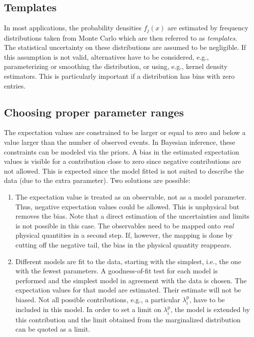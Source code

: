 \documentclass[11pt, a4paper]{article}
\begin{document}
\subsection{Templates} 

In most applications, the probability densities $f_{j}(x)$ are
estimated by frequency distributions taken from Monte Carlo which are
then referred to as {\it templates}. The statistical uncertainty on
these distributions are assumed to be negligible. If this assumption
is not valid, alternatives have to be considered, e.g., parameterizing
or smoothing the distribution, or using, e.g., kernel density
estimators. This is particularly important if a distribution has bins
with zero entries. 

\subsection{Choosing proper parameter ranges} 

The expectation values are constrained to be larger or equal to zero
and below a value larger than the number of observed events. In
Bayesian inference, these constraints can be modeled via the priors. A
bias in the estimated expectation values is visible for a contribution
close to zero since negative contributions are not allowed. This is
expected since the model fitted is not suited to describe the data
(due to the extra parameter). Two solutions are possible:
%
\begin{enumerate}
	\item The expectation value is treated as an observable, not as a
	model parameter. Thus, negative expectation values could be
	allowed. This is unphysical but removes the bias. Note that a direct
	estimation of the uncertainties and limits is not possible in this
	case. The observables need to be mapped onto {\it real} physical
	quantities in a second step. If, however, the mapping is done by
	cutting off the negative tail, the bias in the physical quantity
	reappears.
%
	\item Different models are fit to the data, starting with the
	simplest, i.e., the one with the fewest parameters. A
	goodness-of-fit test for each model is performed and the simplest
	model in agreement with the data is chosen. The expectation values
	for that model are estimated. Their estimate will not be biased. Not
	all possible contributions, e.g., a particular
	$\lambda_{i}^{\mathrm{p}}$, have to be included in this model.  In
	order to set a limit on $\lambda_{i}^{\mathrm{p}}$, the model is
	extended by this contribution and the limit obtained from the
	marginalized distribution can be quoted as a limit.
\end{enumerate}
\end{document}

